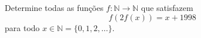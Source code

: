 Determine todas as funções $f : \mathbb{N} \to \mathbb{N}$ que satisfazem
$$f(2f(x)) = x + 1998$$
para todo $x \in \mathbb{N} = \{0, 1, 2, \dots\}$.
